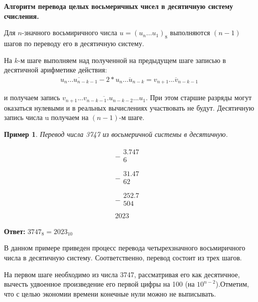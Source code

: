 \documentclass[14pt, russian]{scrartcl}
\newcounter{cExample}
\newtheorem{Example}{Пример}[cExample]
\begin{document}
\vspace{1em}
\textbf{Алгоритм перевода целых восьмеричных чисел в десятичную систему счисления.}

Для $n$-значного восьмиричного числа $u = (u_n...u_1)_8$ выполняются $(n - 1)$ шагов по переводу его в десятичную систему.

На $k$-м шаге выполняем над полученной на предыдущем шаге записью в десятичной арифметике действия:
\label{Example:MathFont4} 
\begin{equation*}\label{eq:4}
\begin{aligned}
\overline{u_n ... u_{n-k-1}} - 2 * \overline{u_n ... u_{n-k}} = \overline{v_{n+1} ... v_{n-k-1}}
\end{aligned}
\end{equation*} 

и получаем запись $\overline{v_{n+1} ... v_{n-k-1}.u_{n-k-2} ... u_1}$. При этом старшие разряды могут оказаться нулевыми и в реальных вычислениях участвовать не будут. Десятичную запись числа u получаем на $(n - 1)$-м шаге.

\begin{Example}\label{Example:MathFont5}
Перевод числа 3747 из восьмеричной системы в десятичную. 

$$
\begin{array}{r}
-
\begin{array}{r}
3.747\\
6\quad\quad\\
\end{array} \\
\hline
-
\begin{array}{r}
31.47\\
62\,\,\,\,\\
\end{array} \\
\hline
-
\begin{array}{r}
252.7\\
504\\
\end{array} \\
\hline
2023\,\,\,
\end{array}
$$
\end{Example} 
\textbf{Ответ:} $3747_8 = 2023_{10}$ 

В данном примере приведен процесс перевода четырехзначного восьмиричного числа в десятичную систему. Соответственно, перевод состоит из трех шагов.

На первом шаге необходимо из числа 3747, рассматривая его как десятичное, вычесть удвоенное произведение его первой цифры на 100 (на $10^{n-2}$).Отметим, что с целью экономии времени конечные нули можно не выписывать.
\end{document}
